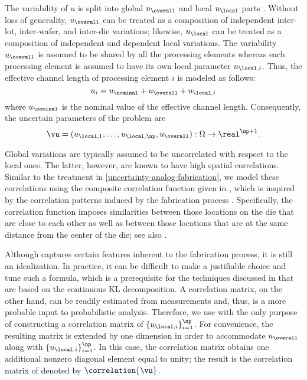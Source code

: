 The variability of $u$ is split into global $u_\overall$ and local $u_\local$
parts \cite{shen2009, chandra2010}. Without loss of generality, $u_\overall$ can
be treated as a composition of independent inter-lot, inter-wafer, and inter-die
variations; likewise, $u_\local$ can be treated as a composition of independent
and dependent local variations. The variability $u_\overall$ is assumed to be
shared by all the \np processing elements whereas each processing element is
assumed to have its own local parameter $u_{\local, i}$. Thus, the effective
channel length of processing element $i$ is modeled as follows:
\[
  u_i = u_\nominal + u_\overall + u_{\local, i}
\]
where $u_\nominal$ is the nominal value of the effective channel length.
Consequently, the uncertain parameters of the problem are
\[
  \vu = (u_{\local, 1}, \dotsc, u_{\local, \np}, u_\overall): \Omega \to \real^{\np + 1}.
\]

Global variations are typically assumed to be uncorrelated with respect to the
local ones. The latter, however, are known to have high spatial correlations.
Similar to the treatment in \cref{uncertainty-analog-fabrication}, we model
these correlations using the composite correlation function given in
, which is inspired by the correlation patterns
induced by the fabrication process \cite{friedberg2005, chandrakasan2000,
cheng2011}. Specifically, the correlation function imposes similarities between
those locations on the die that are close to each other as well as between those
locations that are at the same distance from the center of the die; see also
\cite{ghanem1991, ghanta2006, bhardwaj2008, huang2009a, lee2013}.

Although  captures certain features inherent to the
fabrication process, it is still an idealization. In practice, it can be
difficult to make a justifiable choice and tune such a formula, which is a
prerequisite for the techniques discussed in  that are based
on the continuous \ac{KL} decomposition. A correlation matrix, on the other
hand, can be readily estimated from measurements and, thus, is a more probable
input to probabilistic analysis. Therefore, we use 
with the only purpose of constructing a correlation matrix of $\{ u_{\local, i}
\}_{i = 1}^\np$. For convenience, the resulting matrix is extended by one
dimension in order to accommodate $u_\overall$ along with $\{ u_{\local, i}
\}_{i = 1}^\np$. In this case, the correlation matrix obtains one additional
nonzero diagonal element equal to unity; the result is the correlation matrix of
\vu denoted by $\correlation{\vu}$.

